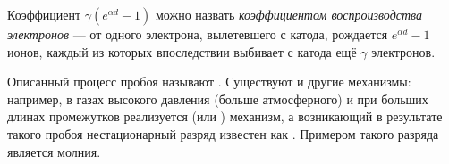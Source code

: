 Коэффициент $\gamma (e^{\alpha d}-1)$ можно назвать
\emph{коэффициентом воспроизводства электронов} --- от одного электрона,
вылетевшего с катода, рождается $e^{\alpha d}-1$ ионов,
каждый из которых впоследствии выбивает с катода ещё $\gamma$ электронов.






Описанный процесс пробоя называют . Существуют и другие
механизмы: например, в газах высокого давления (больше атмосферного) и при
больших длинах промежутков реализуется 
(или ) механизм, а возникающий в результате такого пробоя
нестационарный разряд известен как . Примером такого разряда
является молния.

